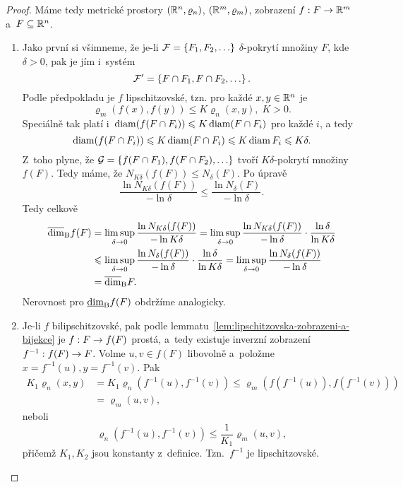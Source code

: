 \begin{proof}
    Máme tedy metrické prostory $(\mathbb{R}^n,\varrho_n)$, $(\mathbb{R}^m,\varrho_m)$, zobrazení $f:F \rightarrow \mathbb{R}^m$ a~$F\subseteq\mathbb{R}^n$.
    \begin{enumerate}[label=\textit{(\roman*)}]
        \item Jako první si všimneme, že je-li $\mathcal{F}=\left\{F_1,F_2,\ldots\right\}$ $\delta$-pokrytí množiny $F$, kde $\delta>0$, pak je jím i~systém
        \[\mathcal{F}^\prime=\left\{F\cap F_1,F\cap F_2,\ldots\right\}.\]
        Podle předpokladu je $f$ lipschitzovské, tzn. pro každé $x,y\in\mathbb{R}^n$ je
        \[\varrho_m(f(x),f(y))\leqslant K\varrho_n(x,y),\;K>0.\]
        Speciálně tak platí i~$\operatorname{diam}(f(F\cap F_i))\leqslant K\operatorname{diam}(F\cap F_i)$ pro každé $i$, a tedy
        \[\operatorname{diam}(f(F\cap F_i))\leqslant K\operatorname{diam}(F\cap F_i)\leqslant K\operatorname{diam}{F_i}\leqslant K\delta.\]
        Z~toho plyne, že $\mathcal{G}=\left\{f(F\cap F_1),f(F\cap F_2),\ldots\right\}$ tvoří $K\delta$-pokrytí množiny $f(F)$. Tedy máme, že $N_{K\delta}(f(F))\leqslant N_\delta(F)$. Po úpravě
        \[\dfrac{\ln{N_{K\delta}(f(F))}}{-\ln{\delta}}\leqslant\dfrac{\ln{N_\delta(F)}}{-\ln{\delta}}.\]
        Tedy celkově
        \begin{align*}
            \overline{\dim}_\textup{B}{f(F)}&=\limsup_{\delta\to 0}\dfrac{\ln{N_{K\delta}(f(F))}}{-\ln{K\delta}}=\limsup_{\delta\to 0}\dfrac{\ln{N_{K\delta}(f(F))}}{-\ln{\delta}}\cdot\dfrac{\ln{\delta}}{\ln{K\delta}}\\
            &\leqslant\limsup_{\delta\to 0}\dfrac{\ln{N_{\delta}(f(F))}}{-\ln{\delta}}\cdot\dfrac{\ln{\delta}}{\ln{K\delta}}=\limsup_{\delta\to 0}\dfrac{\ln{N_{\delta}(f(F))}}{-\ln{\delta}}\\
            &=\overline{\dim}_\textup{B}{F}.
        \end{align*}
        Nerovnost pro $\underline{\dim}_\textup{B}{f(F)}$ obdržíme analogicky.
        \item Je-li $f$ bilipschitzovské, pak podle lemmatu~\ref{lem:lipschitzovska-zobrazeni-a-bijekce} je $f:F \rightarrow f(F)$ prostá, a~tedy existuje inverzní zobrazení $f^{-1}:f(F) \rightarrow F$. Volme $u,v\in f(F)$ libovolně a~položme $x=f^{-1}(u),y=f^{-1}(v)$. Pak
        \begin{align*}
            K_1\varrho_n(x,y)&=K_1\varrho_n(f^{-1}(u),f^{-1}(v))\leqslant\varrho_m(f(f^{-1}(u)),f(f^{-1}(v)))\\
            &=\varrho_m(u,v),
        \end{align*}
        neboli
        \[\varrho_n(f^{-1}(u),f^{-1}(v))\leqslant\dfrac{1}{K_1}\varrho_m(u,v),\]
        přičemž $K_1,K_2$ jsou konstanty z~definice. Tzn.~$f^{-1}$ je lipschitzovské.


\end{enumerate}
\end{proof}
